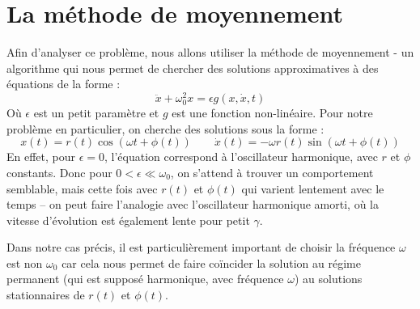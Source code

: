 \section{La méthode de moyennement}
%
Afin d'analyser ce problème, nous allons utiliser la méthode de 
moyennement \cite{rand_lecture_2012} - un algorithme %
qui nous permet de chercher des solutions approximatives à des équations de la forme :
\begin{equation}
    \ddot{x} + \omega_0^2 x = \epsilon g(x, \dot{x}, t)
\end{equation}
Où $\epsilon$ est un petit paramètre et $g$ est une fonction non-linéaire. Pour notre problème en particulier, on cherche des solutions sous la forme :
\begin{equation}
x(t) = r(t)\cos(\omega t + \phi(t)) \qquad \dot{x}(t) =  -\omega r(t)\sin(\omega t + \phi(t))
\label{eq:duff_x_xdot}
\end{equation}
%
En effet, pour $\epsilon=0$, l'équation correspond à l'oscillateur harmonique, avec $r$ et $\phi$ constants.
Donc pour $0 < \epsilon \ll \omega_0$, on s'attend à trouver un comportement semblable, mais cette fois avec $r(t)$ et $\phi(t)$ 
qui varient lentement avec le temps – on peut faire l'analogie avec l'oscillateur harmonique amorti, où la vitesse d'évolution est également lente pour petit $\gamma$.
%

Dans notre cas précis, il est particulièrement important de choisir la fréquence $\omega$ est non $\omega_0$ car cela nous permet de faire coïncider la solution au régime permanent (qui est supposé harmonique, avec fréquence $\omega$)
au solutions stationnaires de $r(t)$ et $\phi(t)$. 

